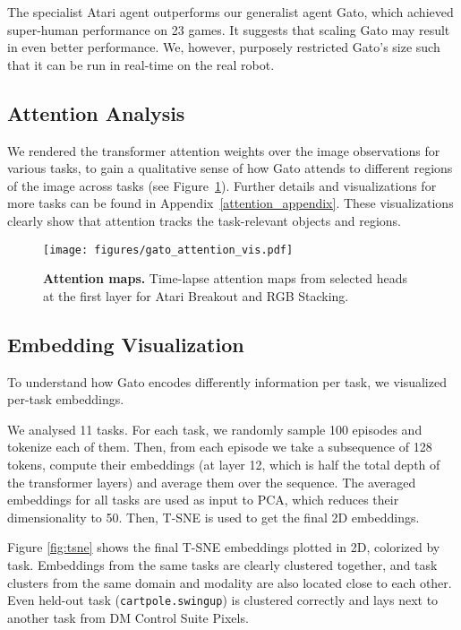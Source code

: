 \documentclass[10pt]{article} \usepackage[accepted]{tmlr}
\newcommand{\model}{{Gato}}
\newcommand{\dmcontrolpixels}{{DM Control Suite Pixels}}
\begin{document}
The specialist Atari agent outperforms our generalist agent \model{}, which achieved super-human performance on 23 games.
It suggests that scaling \model{} may result in even better performance.
We, however, purposely restricted \model{}'s size such that it can be run in real-time on the real robot.
\vskip 0.4cm
\subsection{Attention Analysis}
\label{sec:attention}
\vskip 0.2cm
We rendered the transformer attention weights over the image observations for various tasks, to gain a qualitative sense of how Gato attends to different regions of the image across tasks (see Figure~\ref{fig:attention}).
Further details and visualizations for more tasks can be found in Appendix~\ref{attention_appendix}.
These visualizations clearly show that attention tracks the task-relevant objects and regions.

\begin{figure}[t]
    \centering
    \texttt{[image: figures/gato\_attention\_vis.pdf]} 
    \caption{
    {\bf Attention maps.} Time-lapse attention maps from selected heads at the first layer for Atari Breakout and RGB Stacking.
    \small}
    \label{fig:attention}
\end{figure}
\vskip 0.4cm
\subsection{Embedding Visualization}
\label{sec:tsne}
\vskip 0.2cm
To understand how Gato encodes differently information per task, we visualized per-task embeddings.


We analysed 11 tasks.
For each task, we randomly sample 100 episodes and tokenize each of them.
Then, from each episode we take a subsequence of 128 tokens, compute their embeddings (at layer 12, which is half the total depth of the transformer layers) and average them over the sequence.
The averaged embeddings for all tasks are used as input to PCA, which reduces their dimensionality to 50.
Then, T-SNE is used to get the final 2D embeddings.


Figure \ref{fig:tsne} shows the final T-SNE embeddings plotted in 2D, colorized by task.
Embeddings from the same tasks are clearly clustered together, and task clusters from the same domain and modality are also located close to each other. Even held-out task (\texttt{cartpole.swingup}) is clustered correctly and lays next to another task from \dmcontrolpixels{}.
\end{document}
